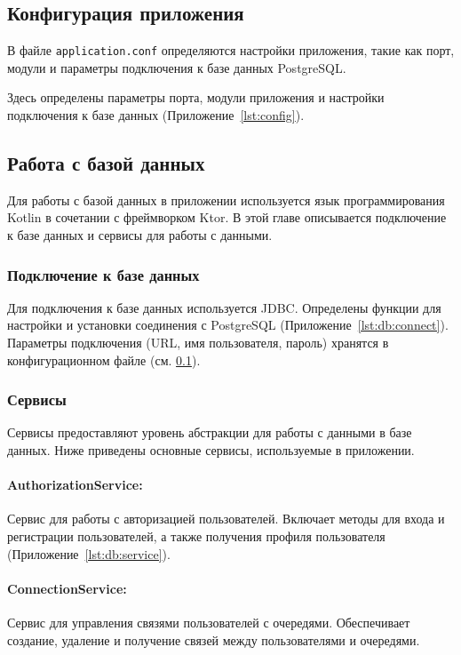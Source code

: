 \subsection{Конфигурация приложения}\label{sc:server:config}

В файле \texttt{application.conf} определяются настройки приложения,
такие как порт, модули и параметры подключения к базе данных PostgreSQL.\par
Здесь определены параметры порта, модули приложения
и настройки подключения к базе данных (Приложение~\ref{lst:config}).

\subsection{Работа с базой данных}

Для работы с базой данных в приложении используется язык программирования Kotlin в сочетании с фреймворком Ktor. В этой главе описывается подключение к базе данных и сервисы для работы с данными.

\subsubsection{Подключение к базе данных}
Для подключения к базе данных используется JDBC.
Определены функции для настройки и установки соединения с PostgreSQL
(Приложение~\ref{lst:db:connect}).
Параметры подключения (URL, имя пользователя, пароль)
хранятся в конфигурационном файле (см. \ref{sc:server:config}).\par

\subsubsection{Сервисы}
Сервисы предоставляют уровень абстракции для работы с данными в базе данных.
Ниже приведены основные сервисы, используемые в приложении.

\paragraph{AuthorizationService:} Сервис для работы
с авторизацией пользователей. Включает методы для входа
и регистрации пользователей, а также получения профиля пользователя
(Приложение~\ref{lst:db:service}).

\paragraph{ConnectionService:}
Сервис для управления связями пользователей с очередями.
Обеспечивает создание, удаление и получение связей между пользователями
и очередями.

